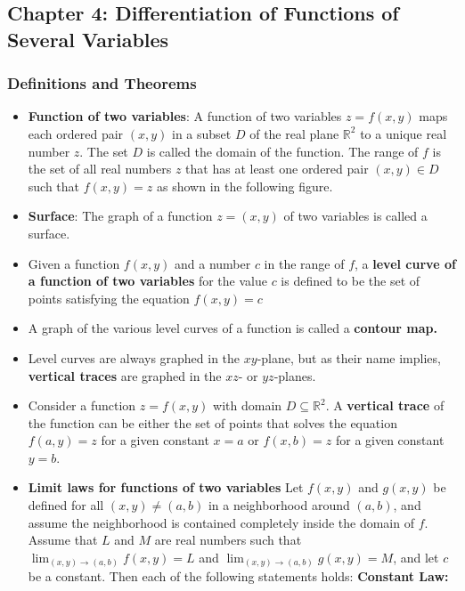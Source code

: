 \documentclass{report}
\begin{document}
    \pagebreak 
    \subsection{Chapter 4: Differentiation of Functions of Several Variables}
    \bigbreak \noindent 
    \subsubsection{Definitions and Theorems}
    \begin{itemize}
        \item \textbf{Function of two variables}:
            A function of two variables $z=f(x,y)$ maps each ordered pair $(x,y)$ in a subset $D$ of the real plane $\mathbb{R}^2$ to a unique real number $z$. The set $D$ is called the domain of the function. The range of $f$ is the set of all real numbers $z$ that has at least one ordered pair $(x,y) \in D$ such that $f(x,y) = z$ as shown in the following figure.
        \item \textbf{Surface}: The graph of a function  $z=(x,y)$ of two variables is called a surface.
        \item Given a function  $f(x,y)$ and a number $c$ in the range of $f$, a \textbf{level curve of a function of two variables} for the value  $c$ is defined to be the set of points satisfying the equation  $f(x,y)=c$
        \item A graph of the various level curves of a function is called a \textbf{contour map.}
        \item Level curves are always graphed in the  $xy$-plane, but as their name implies, \textbf{vertical traces} are graphed in the  $xz$- or  $yz$-planes.
        \item Consider a function $z=f(x,y)$ with domain $D \subseteq \mathbb{R}^2$. A \textbf{vertical trace} of the function can be either the set of points that solves the equation $f(a,y)=z$ for a given constant $x=a$ or $f(x,b)=z$ for a given constant $y=b$.
        \item \textbf{Limit laws for functions of two variables}
            Let $f(x,y)$ and $g(x,y)$ be defined for all $(x,y) \neq (a,b)$ in a neighborhood around $(a,b)$, and assume the neighborhood is contained completely inside the domain of $f$. Assume that $L$ and $M$ are real numbers such that $\lim_{(x,y) \to (a,b)} f(x,y) = L$ and $\lim_{(x,y) \to (a,b)} g(x,y) = M$, and let $c$ be a constant. Then each of the following statements holds:
            \bigbreak \noindent 
            \textbf{Constant Law:}

\end{itemize}
\end{document}
